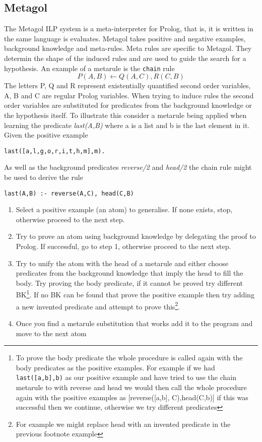 \subsection{Metagol}
The Metagol ILP system is a meta-interpreter for Prolog, that is, it is written in the same language is evaluates. Metagol takes positive and negative examples, background knowledge and meta-rules. Meta rules are specific to Metagol. They determin the shape of the induced rules and are used to guide the search for a hypothesis. An example of a metarule is the \texttt{chain} rule \[P(A,B) \leftarrow Q(A,C),R(C,B)\] The letters P, Q and R represent existentially quantified second order variables, A, B and C are regular Prolog variables. When trying to induce rules the second order variables are substituted for predicates from the background knowledge or the hypothesis itself. To illustrate this consider a metarule being applied when learning the predicate \textit{last(A,B)} where a is a list and b is the last element in it. Given the positive example
\begin{verbatim}
last([a,l,g,o,r,i,t,h,m],m).
\end{verbatim}

As well as the background predicates \textit{reverse/2} and \textit{head/2} the chain rule might be used to derive the rule
\begin{verbatim}
last(A,B) :- reverse(A,C), head(C,B)
\end{verbatim}


\cite{Andrew/ILP-review}\cite{Rolf/Metagol}\cite{Metagol/Github}
\begin{enumerate}
\item Select a positive example (an atom) to generalise. If none exists, stop, otherwise proceed to the next step.
\item Try to prove an atom using background knowledge by delegating the proof to Prolog. If successful, go to step 1, otherwise proceed to the next step.
\item Try to unify the atom with the head of a metarule and either choose predicates from the background knowledge that imply the head to fill the body. Try proving the body predicate, if it cannot be proved try different BK\footnote{To prove the body predicate the whole procedure is called again with the body predicates as the positive examples. For example if we had \texttt{last([a,b],b)} as our positive example and have tried to use the chain metarule to with reverse and head we would then call the whole procedure again with the positive examples as [reverse([a,b], C),head(C,b)] if this was successful then we continue, otherwise we try different predicates}. If no BK can be found that prove the positive example then try adding a new invented predicate and attempt to prove this\footnote{For example we might replace head with an invented predicate in the previous footnote example}.
\item Once you find a metarule substitution that works add it to the program and move to the next atom
\end{enumerate}


